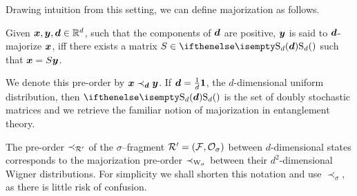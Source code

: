 \documentclass[pra,
aps,
twocolumn,
superscriptaddress,
groupedaddress,
nofootinbib,
reprint
]{revtex4-1}
\begin{document}
Drawing intuition from this setting, we can define majorization as follows.
\begin{definition}\label{def:dmajor}
    Given $\bm{x}, \bm{y}, \bm{d} \in \mathbb{R}^d$, such that the components of $\bm{d}$ are positive, $\bm{y}$ is said to $\bm{d}$-majorize $\bm{x}$, iff there exists a matrix $S \in \stoch$ such that $\bm{x} = S\bm{y}$.
\end{definition}
We denote this pre-order by $\bm{x} \prec_{\bm{d}} \bm{y}$.
If $\bm{d} = \frac{1}{d}\bm{1}$, the $d$-dimensional uniform distribution, then $\stoch$ is the set of doubly stochastic matrices and we retrieve the familiar notion of majorization in entanglement theory. 

The pre-order $\prec_{\mathcal{R}'}$ of the $\sigma$--fragment $\mathcal{R}' = (\mathcal{F}, \mathcal{O}_\sigma)$ between $d$-dimensional states corresponds to the majorization pre-order $\prec_{\W{\sigma}}$ between their $d^2$-dimensional Wigner distributions. For simplicity we shall shorten this notation and use $\prec_\sigma$, as there is little risk of confusion. 
\end{document}
